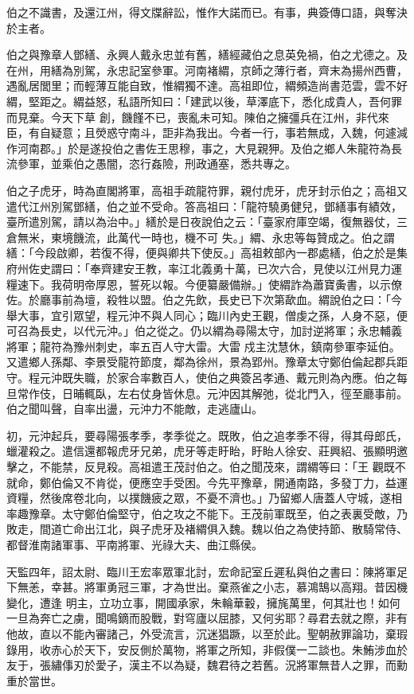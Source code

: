 \begin{pinyinscope}
 伯之不識書，及還江州，得文牒辭訟，惟作大諾而已。有事，典簽傳口語，與奪決於主者。



 伯之與豫章人鄧繕、永興人戴永忠並有舊，繕經藏伯之息英免禍，伯之尤德之。及在州，用繕為別駕，永忠記室參軍。河南褚緭，京師之薄行者，齊末為揚州西曹，遇亂居閭里；而輕薄互能自致，惟緭獨不達。高祖即位，緭頻造尚書范雲，雲不好緭，堅距之。緭益怒，私語所知曰：「建武以後，草澤底下，悉化成貴人，吾何罪而見棄。今天下草
 創，饑饉不已，喪亂未可知。陳伯之擁彊兵在江州，非代來臣，有自疑意；且熒惑守南斗，詎非為我出。今者一行，事若無成，入魏，何遽減作河南郡。」於是遂投伯之書佐王思穆，事之，大見親狎。及伯之鄉人朱龍符為長流參軍，並乘伯之愚闇，恣行姦險，刑政通塞，悉共專之。



 伯之子虎牙，時為直閣將軍，高祖手疏龍符罪，親付虎牙，虎牙封示伯之；高祖又遣代江州別駕鄧繕，伯之並不受命。答高祖曰：「龍符驍勇健兒，鄧繕事有績效，臺所遣別駕，請以為治中。」繕於是日夜說伯之云：「臺家府庫空竭，復無器仗，三倉無米，東境饑流，此萬代一時也，機不可
 失。」緭、永忠等每贊成之。伯之謂繕：「今段啟卿，若復不得，便與卿共下使反。」高祖敕部內一郡處繕，伯之於是集府州佐史謂曰：「奉齊建安王教，率江北義勇十萬，已次六合，見使以江州見力運糧速下。我荷明帝厚恩，誓死以報。今便纂嚴備辦。」使緭詐為蕭寶夤書，以示僚佐。於廳事前為壇，殺牲以盟。伯之先飲，長史已下次第歃血。緭說伯之曰：「今舉大事，宜引眾望，程元沖不與人同心；臨川內史王觀，僧虔之孫，人身不惡，便可召為長史，以代元沖。」伯之從之。仍以緭為尋陽太守，加討逆將軍；永忠輔義將軍；龍符為豫州刺史，率五百人守大雷。大雷
 戍主沈慧休，鎮南參軍李延伯。又遣鄉人孫鄰、李景受龍符節度，鄰為徐州，景為郢州。豫章太守鄭伯倫起郡兵距守。程元沖既失職，於家合率數百人，使伯之典簽呂孝通、戴元則為內應。伯之每旦常作伎，日晡輒臥，左右仗身皆休息。元沖因其解弛，從北門入，徑至廳事前。伯之聞叫聲，自率出盪，元沖力不能敵，走逃廬山。



 初，元沖起兵，要尋陽張孝季，孝季從之。既敗，伯之追孝季不得，得其母郎氏，蠟灌殺之。遣信還都報虎牙兄弟，虎牙等走盱眙，盱眙人徐安、莊興紹、張顯明邀擊之，不能禁，反見殺。高祖遣王茂討伯之。伯之聞茂來，謂緭等曰：「王
 觀既不就命，鄭伯倫又不肯從，便應空手受困。今先平豫章，開通南路，多發丁力，益運資糧，然後席卷北向，以撲饑疲之眾，不憂不濟也。」乃留鄉人唐蓋人守城，遂相率趣豫章。太守鄭伯倫堅守，伯之攻之不能下。王茂前軍既至，伯之表裏受敵，乃敗走，間道亡命出江北，與子虎牙及褚緭俱入魏。魏以伯之為使持節、散騎常侍、都督淮南諸軍事、平南將軍、光祿大夫、曲江縣侯。



 天監四年，詔太尉、臨川王宏率眾軍北討，宏命記室丘遲私與伯之書曰：陳將軍足下無恙，幸甚。將軍勇冠三軍，才為世出。棄燕雀之小志，慕鴻鵠以高翔。昔因機變化，遭逢
 明主，立功立事，開國承家，朱輪華轂，擁旄萬里，何其壯也！如何一旦為奔亡之虜，聞鳴鏑而股戰，對穹廬以屈膝，又何劣耶？尋君去就之際，非有他故，直以不能內審諸己，外受流言，沉迷猖蹶，以至於此。聖朝赦罪論功，棄瑕錄用，收赤心於天下，安反側於萬物，將軍之所知，非假僕一二談也。朱鮪涉血於友于，張繡倳刃於愛子，漢主不以為疑，魏君待之若舊。況將軍無昔人之罪，而勳重於當世。




\end{pinyinscope}
